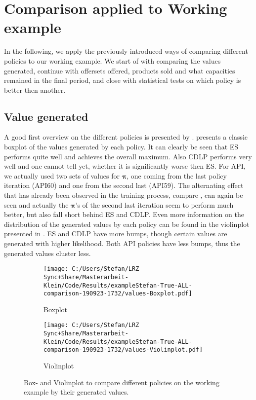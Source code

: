 \section{Comparison applied to Working example}\label{s:CompWorkEx}

In the following, we apply the previously introduced ways of comparing different policies to our working example. We start of with comparing the values generated, continue with offersets offered, products sold and what capacities remained in the final period, and close with statistical tests on which policy is better then another.

\subsection{Value generated}

A good first overview on the different policies is presented by .  presents a classic boxplot of the values generated by each policy. It can clearly be seen that ES performs quite well and achieves the overall maximum. Also CDLP performs very well and one cannot tell yet, whether it is significantly worse then ES. For API, we actually used two sets of values for $\boldsymbol{\pi}$, one coming from the last policy iteration (API60) and one from the second last (API59). The alternating effect that has already been observed in the training process, compare , can again be seen and actually the $\boldsymbol{\pi}$'s of the second last iteration seem to perform much better, but also fall short behind ES and CDLP. Even more information on the distribution of the generated values by each policy can be found in the violinplot presented in . ES and CDLP have more bumps, though certain values are generated with higher likelihood. Both API policies have less bumps, thus the generated values cluster less.

\begin{figure}[!ht]
	\begin{subfigure}[t]{.5\textwidth}
		\centering	
		\texttt{[image: C:/Users/Stefan/LRZ Sync+Share/Masterarbeit-Klein/Code/Results/exampleStefan-True-ALL-comparison-190923-1732/values-Boxplot.pdf]}
		\caption{\label{fig-comp-work-valBox} Boxplot}
	\end{subfigure}%
	\begin{subfigure}[t]{.5\textwidth}
		\centering
		\texttt{[image: C:/Users/Stefan/LRZ Sync+Share/Masterarbeit-Klein/Code/Results/exampleStefan-True-ALL-comparison-190923-1732/values-Violinplot.pdf]}
		\caption{\label{fig-comp-work-valVio} Violinplot}
	\end{subfigure}
	\caption[Box- and Violinplot for comparison of working example - values.]{\label{fig-comp-work-val}Box- and Violinplot to compare different policies on the working example by their generated values.}
\end{figure}

